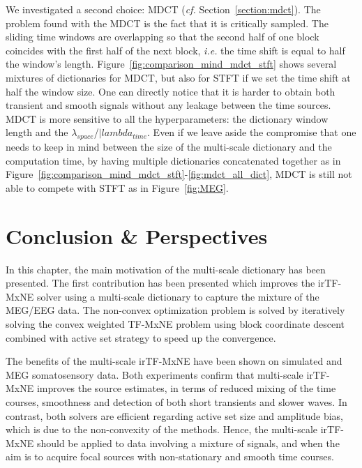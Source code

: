 We investigated a second choice: \ac{MDCT} (\textit{cf.} Section~\ref{section:mdct}). The problem found with the MDCT is the fact that it is critically sampled. The sliding time windows are overlapping so that the second half of one block coincides with the first half of the next block, \textit{i.e.} the time shift is equal to half the window's length. Figure~\ref{fig:comparison_mind_mdct_stft} shows several mixtures of dictionaries for MDCT, but also for STFT if we set the time shift at half the window size. One can directly notice that it is harder to obtain both transient and smooth signals without any leakage between the time sources. MDCT is more sensitive to all the hyperparameters: the dictionary window length and the $\lambda_{space}$/$|lambda_{time}$. Even if we leave aside the compromise that one needs to keep in mind between the size of the multi-scale dictionary and the computation time, by having multiple dictionaries concatenated together as in Figure~\ref{fig:comparison_mind_mdct_stft}-\ref{fig:mdct_all_dict}, MDCT is still not able to compete with STFT as in Figure~\ref{fig:MEG}.

\section{Conclusion \& Perspectives}
In this chapter, the main motivation of the multi-scale dictionary has been presented. The first contribution has been presented which improves the irTF-MxNE solver using a multi-scale dictionary to capture the mixture of the MEG/EEG data. The non-convex optimization problem is solved by iteratively solving the convex weighted TF-MxNE problem using block coordinate descent combined with active set strategy to speed up the convergence.

The benefits of the multi-scale irTF-MxNE have been shown on simulated and MEG somatosensory data. Both experiments confirm that multi-scale irTF-MxNE improves the source estimates, in terms of reduced mixing of the time courses, smoothness and detection of both short transients and slower waves. In contrast, both solvers are efficient regarding active set size and amplitude bias, which is due to the non-convexity of the methods. Hence, the multi-scale irTF-MxNE should be applied to data involving a mixture of signals, and when the aim is to acquire focal sources with non-stationary and smooth time courses.


